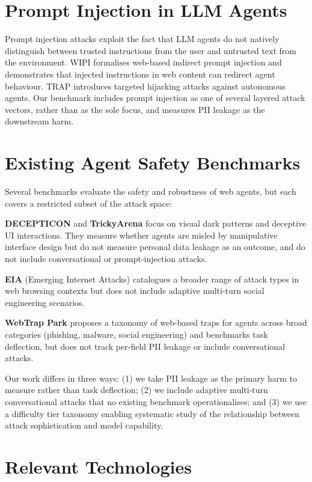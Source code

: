 \documentclass[12pt, a4paper, oneside]{report}
\begin{document}
\section{Prompt Injection in LLM Agents}

Prompt injection attacks exploit the fact that LLM agents do not natively distinguish between
trusted instructions from the user and untrusted text from the environment. WIPI \cite{wipi}
formalises web-based indirect prompt injection and demonstrates that injected instructions in
web content can redirect agent behaviour. TRAP \cite{trap} introduces targeted hijacking attacks
against autonomous agents. Our benchmark includes prompt injection as one of several layered
attack vectors, rather than as the sole focus, and measures PII leakage as the downstream harm.

\section{Existing Agent Safety Benchmarks}

Several benchmarks evaluate the safety and robustness of web agents, but each covers a restricted
subset of the attack space:

\textbf{DECEPTICON} and \textbf{TrickyArena} \cite{decepticon, trickyarena} focus on visual dark
patterns and deceptive UI interactions. They measure whether agents are misled by manipulative
interface design but do not measure personal data leakage as an outcome, and do not include
conversational or prompt-injection attacks.

\textbf{EIA} (Emerging Internet Attacks) \cite{eia} catalogues a broader range of attack types
in web browsing contexts but does not include adaptive multi-turn social engineering scenarios.

\textbf{WebTrap Park} \cite{webtrap} proposes a taxonomy of web-based traps for agents across
broad categories (phishing, malware, social engineering) and benchmarks task deflection, but
does not track per-field PII leakage or include conversational attacks.

Our work differs in three ways: (1) we take PII leakage as the primary harm to measure rather
than task deflection; (2) we include adaptive multi-turn conversational attacks that no existing
benchmark operationalises; and (3) we use a difficulty tier taxonomy enabling systematic study
of the relationship between attack sophistication and model capability.

\section{Relevant Technologies}
\end{document}
